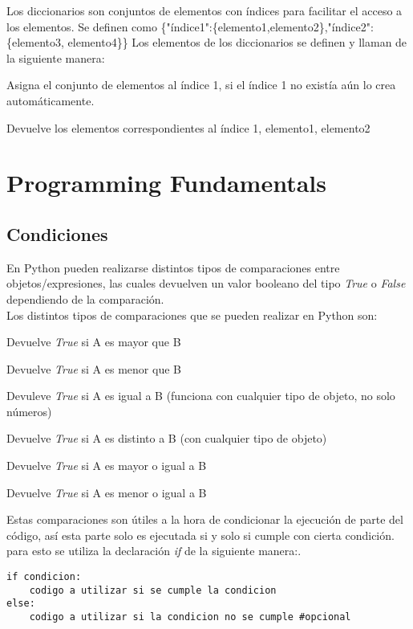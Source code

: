 \documentclass[10pt,a4paper]{article}
\begin{document}
\begin{description}[
align=right,
labelindent = 1cm,
labelsep=0.5cm,
itemindent=0cm]
\item [dictionary]
Los diccionarios son conjuntos de elementos con índices para facilitar el acceso a los elementos. Se definen como \{"índice1":\{elemento1,elemento2\},"índice2":\{elemento3, elemento4\}\}
Los elementos de los diccionarios se definen y llaman de la siguiente manera:

\begin{description}[leftmargin=!,labelwidth=2.5cm,itemindent=0cm]
\item [{$>>$ dic['índice1'] = \{elemento1,elemento2\}}] Asigna el conjunto de elementos al índice 1, si el índice 1 no existía aún lo crea automáticamente.
\item [{$>>$ dic['índice1']}]   Devuelve los elementos correspondientes al índice 1, {elemento1, elemento2} 
\end{description}
\end{description}
\section{Programming Fundamentals}
\subsection{Condiciones}
En Python pueden realizarse distintos tipos de comparaciones entre objetos/expresiones, las cuales devuelven un valor booleano del tipo \emph{True} o \emph{False} dependiendo de la comparación.\\
Los distintos tipos de comparaciones que se pueden realizar en Python son:\\
\begin{description}[leftmargin=!, labelwidth=2.5cm,itemindent=0cm]
\item [A $>$ B] Devuelve \emph{True} si A es mayor que B
\item [A $<$ B] Devuelve \emph{True} si A es menor que B
\item [A == B] Devuleve \emph{True} si A es igual a B (funciona con cualquier tipo de objeto, no solo números)
\item [A != B] Devuelve \emph{True} si A es distinto a B (con cualquier tipo de objeto) 
\item [A $>=$ B] Devuelve \emph{True} si A es mayor o igual a B
\item [A $<=$ B] Devuelve \emph{True} si A es menor o igual a B
\end{description}
\noindent Estas comparaciones son útiles a la hora de condicionar la ejecución de parte del código, así esta parte solo es ejecutada si y solo si cumple con cierta condición. para esto se utiliza la declaración \emph{if} de la siguiente manera:.
\begin{lstlisting}
if condicion:
    codigo a utilizar si se cumple la condicion
else:
    codigo a utilizar si la condicion no se cumple #opcional\end{lstlisting}
\end{document}
